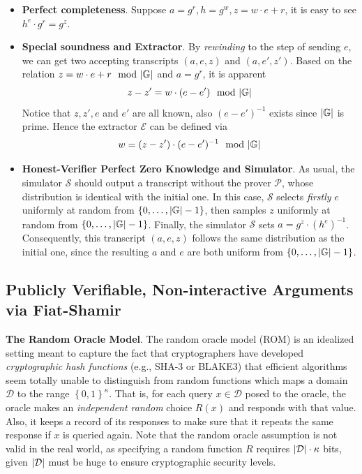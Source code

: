 \documentclass{article}
\begin{document}
\begin{itemize}
\item \textbf{Perfect completeness}. Suppose $a = g^r, h = g^w, z = w \cdot e + r$, it is easy to see $h^e \cdot g^r = g^z$. 
\item \textbf{Special soundness and Extractor}. By \textit{rewinding} to the step of sending $e$, we can get two accepting transcripts $(a, e, z)$ and $(a, e', z')$. Based on the relation $z = w \cdot e + r \mod \abs{\mathbb{G}}$ and $a = g^r$, it is apparent 
\begin{equation*}
z - z' = w \cdot (e - e') \mod \abs{\mathbb{G}}
\end{equation*}
Notice that $z, z', e$ and $e'$ are all known, also $(e - e')^{-1}$ exists since $\abs{\mathbb{G}}$ is prime. Hence the extractor $\mathcal{E}$ can be defined via 
\begin{equation*}
w = (z - z') \cdot (e - e')^{-1} \mod \abs{\mathbb{G}}
\end{equation*}
\item \textbf{Honest-Verifier Perfect Zero Knowledge and Simulator}. As usual, the simulator $\mathcal{S}$ should output a transcript without the prover $\mathcal{P}$, whose distribution is identical with the initial one. In this case, $\mathcal{S}$ selects \textit{firstly} $e$ uniformly at random from $\left\{ 0, \dots, \abs{\mathbb{G}}-1 \right\}$, then samples $z$ uniformly at random from $\left\{ 0, \dots, \abs{\mathbb{G}}-1 \right\}$. Finally, the simulator $\mathcal{S}$ sets $a = g^z \cdot (h^e)^{-1}$. Consequently, this transcript $(a, e, z)$ follows the same distribution as the initial one, since the resulting $a$ and $e$ are both uniform from $\left\{ 0, \dots, \abs{\mathbb{G}}-1 \right\}$. 
\end{itemize}


\subsection{Publicly Verifiable, Non-interactive Arguments via Fiat-Shamir}

\textbf{The Random Oracle Model}. The random oracle model (ROM) is an idealized setting meant to capture the fact that cryptographers have developed \textit{cryptographic hash functions} (e.g., SHA-3 or BLAKE3) that efficient algorithms seem totally unable to distinguish from random functions which maps a domain $\mathcal{D}$ to the range $\left\{ 0, 1 \right\}^{\kappa}$. That is, for each query $x \in \mathcal{D}$ posed to the oracle, the oracle makes an \textit{independent random} choice $R(x)$ and responds with that value. Also, it keeps a record of its responses to make sure that it repeats the same response if $x$ is queried again. Note that the random oracle assumption is not valid in the real world, as specifying a random function $R$ requires $\abs{\mathcal{D}} \cdot \kappa$ bits, given $\abs{\mathcal{D}}$ must be huge to ensure cryptographic security levels. 
\end{document}
